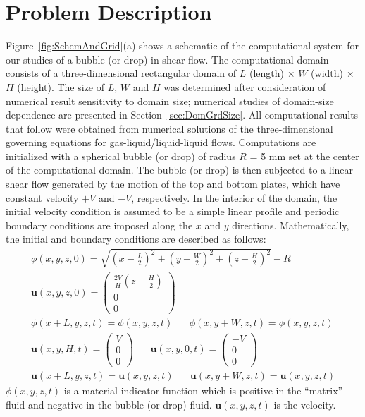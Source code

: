 \documentclass[review]{elsarticle}
\newcommand{\vv}{\mathbf}
\newcommand{\bmu}{\vv{u}}
\begin{document}
\section{Problem Description}

Figure~\ref{fig:SchemAndGrid}(a) shows a schematic of the computational system
for our studies of a bubble (or drop) in shear flow.  The computational domain
consists of a three-dimensional rectangular domain of $L$ (length) $\times$ $W$
(width) $\times$ $H$ (height).  The size of $L$, $W$ and $H$ was determined
after consideration of numerical result sensitivity to domain size; numerical
studies of domain-size dependence are presented in
Section~\ref{sec:DomGrdSize}.  All computational results that follow were
obtained from numerical solutions of the three-dimensional governing equations
for gas-liquid/liquid-liquid flows.  Computations are initialized with a
spherical bubble (or drop) of radius $R$ = 5 mm set at the center of the
computational domain.   The bubble (or drop) is then subjected to a linear
shear flow generated by the motion of the top and bottom plates, which have
constant velocity $+V$ and $-V$, respectively.  In the interior of the domain,
the initial velocity condition is assumed to be a simple linear profile and
periodic boundary conditions are imposed along the $x$ and $y$ directions.
Mathematically, the initial and boundary conditions are described as follows:
%
\begin{eqnarray}
	\phi(x,y,z,0)=\sqrt{(x-\frac{L}{2})^{2}+(y-\frac{W}{2})^{2}+
	(z-\frac{H}{2})^{2}}-R \label{IC_BC} \\
	\bmu(x,y,z,0)=\left( \begin{array}{c}
		\frac{2V}{H}(z-\frac{H}{2}) \\ 0 \\ 0 
	\end{array} \right) \nonumber \\
	\phi(x+L,y,z,t)=\phi(x,y,z,t) \hspace{20pt}
	\phi(x,y+W,z,t)=\phi(x,y,z,t) \nonumber \\
	\bmu(x,y,H,t)=\left( \begin{array}{c}
		                V \\ 0 \\ 0 
	\end{array} \right)  \hspace{20pt}
	\bmu(x,y,0,t)=\left( \begin{array}{c}
		                -V \\ 0 \\ 0 
	\end{array} \right)  \nonumber \\
	\bmu(x+L,y,z,t)=\bmu(x,y,z,t) \hspace{20pt} 
	\bmu(x,y+W,z,t)=\bmu(x,y,z,t) \nonumber
\end{eqnarray}
%
$\phi(x,y,z,t)$ is a material indicator function which is positive in the
``matrix'' fluid and negative in the bubble (or drop) fluid.  $\bmu(x,y,z,t)$
is the velocity.
\end{document}
